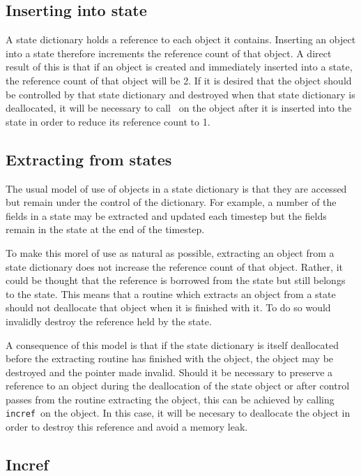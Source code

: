 \documentclass[a4paper, 11pt]{book}
\begin{document}
\subsection{Inserting into state}\label{sec:refcount_state}

A state dictionary holds a reference to each object it contains. Inserting
an object into a state therefore increments the reference count of that
object. A direct result of this is that if an object is created and
immediately inserted into a state, the reference count of that object will
be 2. If it is desired that the object should be controlled by that state
dictionary and destroyed when that state dictionary is deallocated, it will
be necessary to call \deallocate\ on the object after it is inserted into
the state in order to reduce its reference count to 1.

\subsection{Extracting from  states}

The usual model of use of objects in a state dictionary is that they are
accessed but remain under the control of the dictionary. For example, a
number of the fields in a state may be extracted and updated each timestep
but the fields remain in the state at the end of the timestep. 

To make this morel of use as natural as possible, extracting an object from
a state dictionary does not increase the reference count of that
object. Rather, it could be thought that the reference is borrowed from the
state but still belongs to the state. This means that a routine which
extracts an object from a state should not deallocate that object when it is
finished with it. To do so would invalidly destroy the reference held by the
state.

A consequence of this model is that if the state dictionary is itself deallocated
before the extracting routine has finished with the object, the object may
be destroyed and the pointer made invalid. Should it be necessary to
preserve a reference to an object during the deallocation of the state
object or after control passes from the routine extracting the object, this
can be achieved by calling \lstinline+incref+\ on the object. In this case,
it will be necesary to deallocate the object in order to destroy this
reference and avoid a memory leak.

\subsection{Incref}
\end{document}
